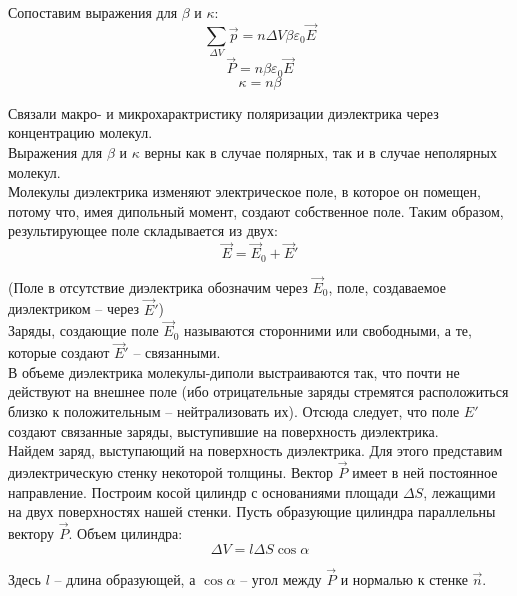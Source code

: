 \documentclass{article}
\begin{document}
	Сопоставим выражения для $\beta$ и $\kappa$:
	\begin{equation}
		\sum_{\Delta V}\vec p = n\Delta V \beta \varepsilon_0 \vec E
	\end{equation}
	\begin{equation}
		\vec P = n \beta \varepsilon_0 \vec E
	\end{equation}
	\begin{equation}
		\kappa = n \beta
	\end{equation}

	Связали макро- и микрохарактристику поляризации диэлектрика через концентрацию молекул.\\

	Выражения для $\beta$ и $\kappa$ верны как в случае полярных, так и в случае неполярных молекул. \\

	Молекулы диэлектрика изменяют электрическое поле, в которое он помещен, потому что, имея дипольный момент, создают собственное поле. Таким образом, результирующее поле складывается из двух:
	\begin{equation}
		\vec E = \vec E_0 + \vec E'
	\end{equation}

	(Поле в отсутствие диэлектрика обозначим через $\vec E_0$, поле, создаваемое диэлектриком -- через $\vec E'$)\\

	Заряды, создающие поле $\vec E_0$ называются сторонними или свободными, а те, которые создают $\vec E'$ -- связанными.\\

	В объеме диэлектрика молекулы-диполи выстраиваются так, что почти не действуют на внешнее поле (ибо отрицательные заряды стремятся расположиться близко к положительным -- нейтрализовать их). Отсюда следует, что поле $E'$ создают связанные заряды, выступившие на поверхность диэлектрика.\\

	Найдем заряд, выступающий на поверхность диэлектрика. Для этого представим диэлектрическую стенку некоторой толщины. Вектор $\vec P$ имеет в ней постоянное направление. Построим косой цилиндр с основаниями площади $\Delta S$, лежащими на двух поверхностях нашей стенки. Пусть образующие цилиндра параллельны вектору $\vec P$. Объем цилиндра:
	\begin{equation}
		\Delta V = l\Delta S \cos\alpha
	\end{equation}

	Здесь $l$ -- длина образующей, а $\cos\alpha$ -- угол между $\vec P$ и нормалью к стенке $\vec n$.\\
\end{document}
